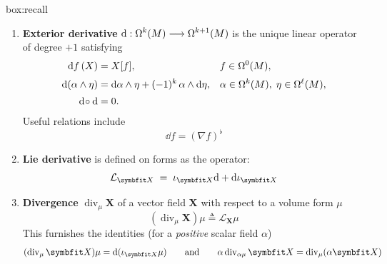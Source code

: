 \begin{ambox}{box:recall}
{\begin{enumerate}
\item \textbf{Exterior derivative} 
$\displaystyle 
\mathrm{d} : \Omega^{k} (M)\longrightarrow\Omega^{k+1} (M)
$
is the unique linear operator of degree \(+1\) satisfying  
\[
\begin{aligned}
\mathrm{d} f\,(X)                &= X[f], && f\in\Omega^{0} (M), \\[2pt]
\mathrm{d}(\alpha\wedge \eta)    &= \mathrm{d}\alpha\wedge \eta + (-1)^{k}\,\alpha\wedge\mathrm{d} \eta,
&& \alpha\in\Omega^{k} (M),\; \eta\in\Omega^{\ell} (M), \\[2pt]
\mathrm{d}\!\circ\mathrm{d}             &= 0.
\end{aligned}
\]
Useful relations include 
\begin{equation}
    \dd f = (\nabla f)^{\flat}
    \label{eq:ident-ext-d}
\end{equation}
%
%
\item \textbf{Lie derivative} is defined on forms as the operator:
\begin{equation}
\mathcal{L}_{\bm{X}} \;=\;\interior{\bm{X}}{\dd} + \dd\interior{\bm{X}}{}
\label{eq:def-lie-form}
\end{equation}
\item \textbf{Divergence} 
\(\operatorname{div}_{\mu}\bm{X}\)
of a vector field \(\bm{X}\) with respect to a volume form \(\mu\)
\begin{equation}
(\operatorname{div}_{\mu}\bm{X})\mu \triangleq \mathcal{L}_{\bm{X}}\mu
\label{eq:def-div}
\end{equation}
This furnishes the identities (for a \emph{positive} scalar field \(\alpha\))
\[
(\operatorname{div}_{\mu}\bm{X})\mu = \dd (\interior{\bm{X}}{\mu})
\qquad\text{and}\qquad
\alpha \operatorname{div}_{\alpha \mu} \bm{X} = \operatorname{div}_{\mu}(\alpha \bm{X})
\]
\end{enumerate}

}
\end{ambox}
